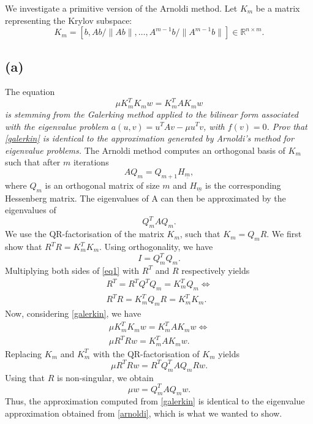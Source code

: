 We investigate a primitive version of the Arnoldi method. Let $K_m$ be a matrix representing the Krylov subspace:
\begin{equation}
K_m = [b, Ab/ \|Ab\|,\dots,A^{m-1}b/ \|A^{m-1}b\|]
\in\mathbb{R}^{n\times m}.
\end{equation}
\subsection{(a)}
The equation
\begin{equation}\label{galerkin}
\mu K_m^TK_mw = K_m^TAK_mw
\end{equation}
\emph{is stemming from the Galerking method applied to the bilinear form associated with the eigenvalue problem $a(u,v) = u^TAv-\mu u^Tv$, with $f(v) = 0$. Prov that \eqref{galerkin} is identical to the approximation generated by Arnoldi's method for eigenvalue problems.}
The Arnoldi method computes an orthogonal basis of $K_m$ such that after $m$ iterations
\begin{equation}
AQ_m = Q_{m+1}H_{\underline{m}},
\end{equation}
where $Q_m$ is an orthogonal matrix of size $m$ and $H_{\underline{m}}$ is the corresponding Hessenberg matrix. The eigenvalues of A can then be approximated by the eigenvalues of
\begin{equation}\label{arnoldi}
Q_m^TAQ_m.
\end{equation}
We use the QR-factorisation of the matrix $K_m$, such that $K_m = Q_mR$. We first show that $R^TR = K_m^TK_m$. Using orthogonality, we have
\begin{equation}\label{eq1}
I = Q^T_mQ_m.
\end{equation}
Multiplying both sides of \eqref{eq1} with $R^T$ and $R$ respectively yields
\begin{equation}
\begin{aligned}
R^T = R^TQ^TQ_m = K^T_mQ_m\Leftrightarrow\\
R^TR  = K^T_mQ_mR = K_m^TK_m.
\end{aligned}
\end{equation}
Now, considering \eqref{galerkin}, we have
\begin{equation}
\begin{aligned}
\mu K_m^TK_mw = K_m^TAK_mw\Leftrightarrow\\
\mu R^TRw = K_m^TAK_mw.
\end{aligned}
\end{equation}
Replacing $K_m$ and $K_m^T$ with the QR-factorisation of $K_m$ yields
\begin{equation}
\mu R^TRw = R^TQ_m^TAQ_mRw.
\end{equation}
Using that $R$ is non-singular, we obtain
\begin{equation}
\mu w = Q_m^TAQ_mw.
\end{equation}
Thus, the approximation computed from \eqref{galerkin} is identical to the eigenvalue approximation obtained from \eqref{arnoldi}, which is what we wanted to show.
